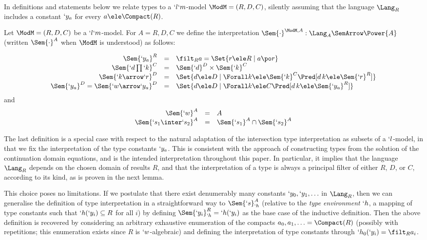 \documentclass{lmcs}
\begin{document}
In definitions and statements below we relate types to a $`l`m$-model ${\ModM}=(R,D,C)$, silently assuming that the language $\Lang_R$ includes a constant $`y_a$ for every $a\ele \Compact(R)$.

 \begin{defi} \label{def:typesInterpretation}
Let ${\ModM}=(R,D,C)$ be a $`l`m$-model.
For $A = R,D,C$ we define the interpretation $ \Sem{ \cdot}^{{\ModM},A} : \Lang_{A} \SemArrow \Power{A}$ (written $\Sem{ \cdot}^A$ when $\ModM$ is understood) as follows:

 \[ \begin{array}[t]{rcl}
\Sem{ `y_a}^R &=& \filt_R a = \Set{r \ele R \mid a \po r} \\ %
\Sem{ `d\prod `k }^C &=& \Sem{`d}^D \times \Sem{ `k }^C \\ %
\Sem{ `k\arrow `r}^D &=& \Set{d \ele D \mid \Forall k \ele \Sem{ `k }^C \Pred [ d \, k \ele \Sem{ `r}^R ]} \\ %
\Sem{ `y_a}^D = \Sem{ `w\arrow `y_a}^D &=& \Set{d \ele D \mid \Forall k \ele C \Pred [ d \, k \ele \Sem{ `y_a}^R ] }
 \end{array} \]
and
%
 \[ \begin{array}[t]{rcl}
\Sem{ `w}^A &=& A \\ %
\Sem{ `s_1 \inter`s_2}^A &=& \Sem{ `s_1}^A \cap \Sem{ `s_2}^A 
 \end{array} \]
 \end{defi}

 \begin{rem} \label{rem:typeconstinterp}
The last definition is a special case with respect to the natural adaptation of the intersection type interpretation as subsets of a $`l$-model, in that we fix the interpretation of the type constants $`y_a$. 
This is consistent with the approach of constructing types from the solution of the continuation domain equations, and is the intended interpretation throughout this paper. 
In particular, it implies that the language $\Lang_R$ depends on the chosen domain of results $R$, and that the interpretation of a type is always a principal filter of either $R$, $D$, or $C$, according to its kind, as is proven in the next lemma. 

This choice poses no limitations. 
If we postulate that there exist denumerably many constants $`y_0, `y_1, \ldots$ in $\Lang_R$, then we can generalise the definition of type interpretation in a straightforward way to $\Sem{`s}^A_{`h}$ (relative to the \emph{type environment} $`h$, a mapping of type constants such that $`h(`y_i) \subseteq R$ for all $i$) by defining $\Sem{ `y_i}^R_{`h} = `h(`y_i)$ as the base case of the inductive definition. 
Then the above definition is recovered by considering an arbitrary exhaustive enumeration of the compacts $a_0, a_1, \ldots = \Compact(R)$ (possibly with repetitions; this enumeration exists since $R$ is $`w$-algebraic) and defining the interpretation of type constants through $`h_0(`y_i) = \filt_R a_i$.
 \end{rem}
\end{document}
